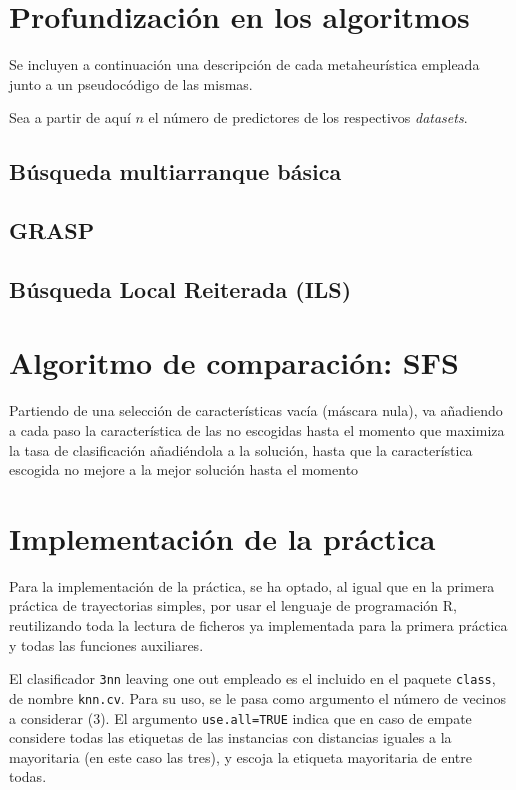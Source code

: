\documentclass[a4paper,11pt]{article}
\begin{document}
\section{Profundización en los algoritmos}
Se incluyen a continuación una descripción de cada metaheurística empleada junto a un pseudocódigo de las mismas.

Sea a partir de aquí $n$ el número de predictores de los respectivos \textit{datasets}.
\subsection{Búsqueda multiarranque básica}

\small{\texttt{}}
\normalsize

\subsection{GRASP}

\small{\texttt{}}
\normalsize

\subsection{Búsqueda Local Reiterada (ILS)}

\small{\texttt{}}
\normalsize

\section{Algoritmo de comparación: SFS}
\small{\texttt{}}

Partiendo de una selección de características vacía (máscara nula), va añadiendo a cada paso la característica
de las no escogidas hasta el momento que maximiza la tasa de clasificación añadiéndola a la solución, hasta
que la característica escogida no mejore a la mejor solución hasta el momento

\section{Implementación de la práctica}
Para la implementación de la práctica, se ha optado, al igual que en la primera práctica de trayectorias simples,
por usar el lenguaje de programación R, reutilizando toda la lectura de ficheros ya implementada para la primera práctica
y todas las funciones auxiliares.

El clasificador \texttt{3nn} leaving one out empleado es el incluido en el paquete \texttt{class}, de nombre
\texttt{knn.cv}. Para su uso, se le pasa como argumento el número de vecinos a considerar (3). El argumento 
\texttt{use.all=TRUE} indica que en caso de empate considere todas las etiquetas de las instancias con distancias 
iguales a la mayoritaria (en este caso las tres), y escoja la etiqueta mayoritaria de entre todas. 
\end{document}
